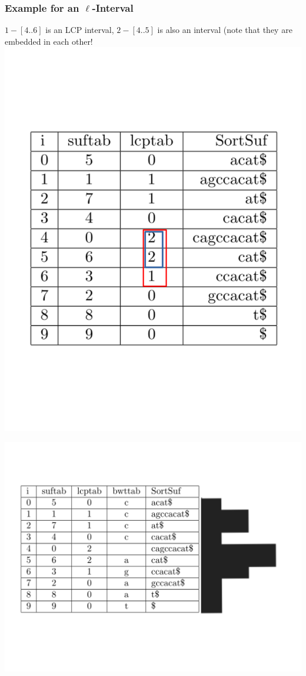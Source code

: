 \documentclass[compress,handout]{beamer} %
\begin{document}
\begin{frame}
	\frametitle{Example for an $\ell$-Interval}
	$1-[4..6]$ is an LCP interval, $2-[4..5]$ is also an interval
	(note that they are embedded in each other!
	\includegraphics[width=\textwidth, height=\textheight, keepaspectratio=true]{esa_example_highlight_interval}
\end{frame}

\begin{frame}
	\includegraphics[width=\textwidth, height=\textheight, keepaspectratio=true]{local_maxima}
\end{frame}
\end{document}
